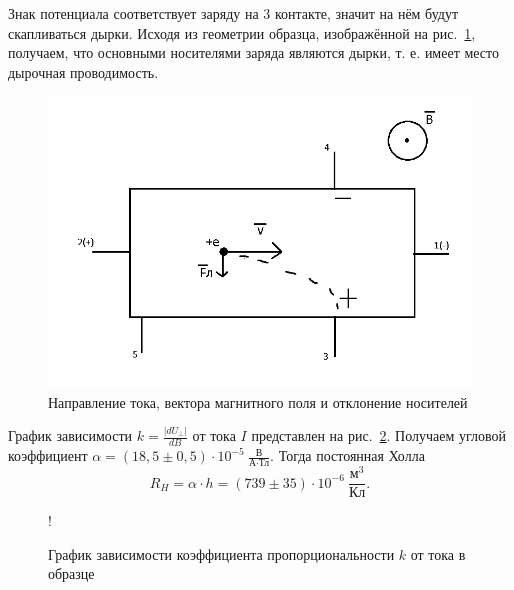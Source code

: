 \documentclass[a4paper,12pt]{article} %
\begin{document}
Знак потенциала соответствует заряду на 3 контакте, значит на нём будут скапливаться дырки. Исходя из геометрии образца, изображённой на рис.~\ref{ris3}, получаем, что основными носителями заряда являются дырки, т. е. имеет место дырочная проводимость.

\begin{figure}[h]
\begin{center}
    \includegraphics[scale=0.5]{pic.png}
\end{center}
\caption{Направление тока, вектора магнитного поля и отклонение носителей}
\label{ris3}
\end{figure}

График зависимости $k = \frac{|dU_{\perp}|}{dB}$ от тока $I$ представлен на рис.~\ref{plot2}. Получаем угловой коэффициент $\alpha = (18,5\pm0,5)\cdot 10^{-5}~\frac{\text{В}}{\text{А} \cdot \text{Тл}}$. Тогда постоянная Холла $$R_H = \alpha \cdot h = (739\pm35) \cdot 10^{-6}~\frac{\text{м}^3}{\text{Кл}}.$$

\begin{figure}[h!]
\centering
{} {!} {
}
\caption{График зависимости коэффициента пропорциональности $k$ от тока в образце}
\label{plot2}
\end{figure}
\end{document}
